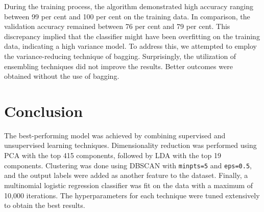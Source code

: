 \documentclass[conference]{IEEEtran}
\begin{document}
During the training process, the algorithm demonstrated high accuracy ranging between 99 per cent and 100 per cent on the training data. In comparison, the validation accuracy remained between 76 per cent  and 79 per cent. This discrepancy implied that the classifier might have been overfitting on the training data, indicating a high variance model. To address this, we attempted to employ the variance-reducing technique of bagging. Surprisingly, the utilization of ensembling techniques did not improve the results. Better outcomes were obtained without the use of bagging.

\section{Conclusion}

The best-performing model was achieved by combining supervised and unsupervised learning techniques. Dimensionality reduction was performed using PCA with the top 415 components, followed by LDA with the top 19 components. Clustering was done using DBSCAN with \texttt{minpts=5} and \texttt{eps=0.5}, and the output labels were added as another feature to the dataset. Finally, a multinomial logistic regression classifier was fit on the data with a maximum of 10,000 iterations. The hyperparameters for each technique were tuned extensively to obtain the best results.
\end{document}
